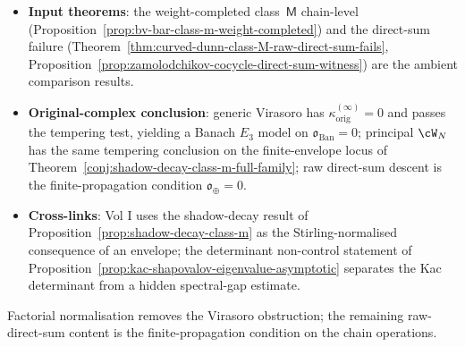 \begin{itemize}[nosep]
\item \textbf{Input theorems}: the weight-completed
 class~$\mathsf{M}$ chain-level
 (Proposition~\ref{prop:bv-bar-class-m-weight-completed}) and
 the direct-sum failure
 (Theorem~\ref{thm:curved-dunn-class-M-raw-direct-sum-fails},
 Proposition~\ref{prop:zamolodchikov-cocycle-direct-sum-witness})
 are the ambient comparison results.
\item \textbf{Original-complex conclusion}: generic Virasoro has
 $\kappa^{(\infty)}_{\mathrm{orig}}=0$ and passes the tempering
 test, yielding a Banach $E_3$ model on
 $\mathfrak{o}_{\mathrm{Ban}}=0$; principal $\cW_N$ has the same
 tempering conclusion on the finite-envelope locus of
 Theorem~\ref{conj:shadow-decay-class-m-full-family}; raw
 direct-sum descent is the finite-propagation condition
 $\mathfrak{o}_{\oplus}=0$.
\item \textbf{Cross-links}: Vol I uses the shadow-decay result of
 Proposition~\ref{prop:shadow-decay-class-m} as the
 Stirling-normalised consequence of an envelope; the
 determinant non-control statement of
 Proposition~\ref{prop:kac-shapovalov-eigenvalue-asymptotic}
 separates the Kac determinant from a hidden spectral-gap
 estimate.
\end{itemize}

Factorial normalisation removes the Virasoro obstruction; the
remaining raw-direct-sum content is the finite-propagation condition
on the chain operations.
